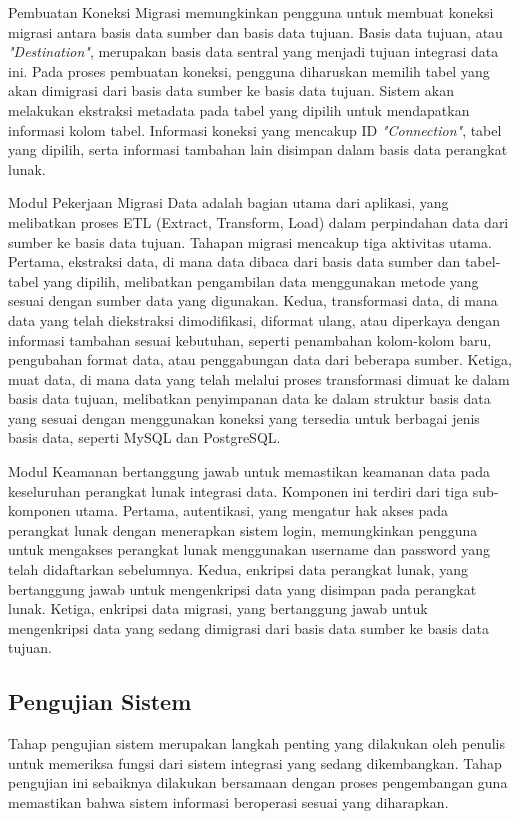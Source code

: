 Pembuatan Koneksi Migrasi memungkinkan pengguna untuk membuat koneksi migrasi antara basis data sumber dan basis data tujuan. Basis data tujuan, atau \emph{"Destination"}, merupakan basis data sentral yang menjadi tujuan integrasi data ini. Pada proses pembuatan koneksi, pengguna diharuskan memilih tabel yang akan dimigrasi dari basis data sumber ke basis data tujuan. Sistem akan melakukan ekstraksi metadata pada tabel yang dipilih untuk mendapatkan informasi kolom tabel. Informasi koneksi yang mencakup ID \emph{"Connection"}, tabel yang dipilih, serta informasi tambahan lain disimpan dalam basis data perangkat lunak.

Modul Pekerjaan Migrasi Data adalah bagian utama dari aplikasi, yang melibatkan proses ETL (Extract, Transform, Load) dalam perpindahan data dari sumber ke basis data tujuan. Tahapan migrasi mencakup tiga aktivitas utama. Pertama, ekstraksi data, di mana data dibaca dari basis data sumber dan tabel-tabel yang dipilih, melibatkan pengambilan data menggunakan metode yang sesuai dengan sumber data yang digunakan. Kedua, transformasi data, di mana data yang telah diekstraksi dimodifikasi, diformat ulang, atau diperkaya dengan informasi tambahan sesuai kebutuhan, seperti penambahan kolom-kolom baru, pengubahan format data, atau penggabungan data dari beberapa sumber. Ketiga, muat data, di mana data yang telah melalui proses transformasi dimuat ke dalam basis data tujuan, melibatkan penyimpanan data ke dalam struktur basis data yang sesuai dengan menggunakan koneksi yang tersedia untuk berbagai jenis basis data, seperti MySQL dan PostgreSQL.

Modul Keamanan bertanggung jawab untuk memastikan keamanan data pada keseluruhan perangkat lunak integrasi data. Komponen ini terdiri dari tiga sub-komponen utama. Pertama, autentikasi, yang mengatur hak akses pada perangkat lunak dengan menerapkan sistem login, memungkinkan pengguna untuk mengakses perangkat lunak menggunakan username dan password yang telah didaftarkan sebelumnya. Kedua, enkripsi data perangkat lunak, yang bertanggung jawab untuk mengenkripsi data yang disimpan pada perangkat lunak. Ketiga, enkripsi data migrasi, yang bertanggung jawab untuk mengenkripsi data yang sedang dimigrasi dari basis data sumber ke basis data tujuan.

\subsection{Pengujian Sistem}
Tahap pengujian sistem merupakan langkah penting yang dilakukan oleh penulis untuk memeriksa fungsi dari sistem integrasi yang sedang dikembangkan. Tahap pengujian ini sebaiknya dilakukan bersamaan dengan proses pengembangan guna memastikan bahwa sistem informasi beroperasi sesuai yang diharapkan.

